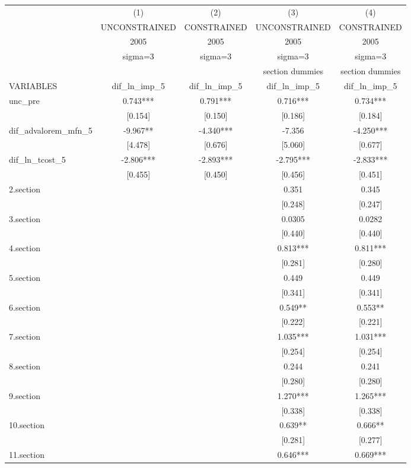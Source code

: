 \begin{tabular}{lcccc}
\toprule
 & (1) & (2) & (3) & (4) \\
 & UNCONSTRAINED & CONSTRAINED & UNCONSTRAINED & CONSTRAINED \\
 & 2005 & 2005 & 2005 & 2005 \\
 & sigma=3 & sigma=3 & sigma=3 & sigma=3 \\
 &  &  & section dummies & section dummies \\
VARIABLES & dif\_ln\_imp\_5 & dif\_ln\_imp\_5 & dif\_ln\_imp\_5 & dif\_ln\_imp\_5 \\
\midrule
unc\_pre & 0.743*** & 0.791*** & 0.716*** & 0.734*** \\
 & [0.154] & [0.150] & [0.186] & [0.184] \\
dif\_advalorem\_mfn\_5 & -9.967** & -4.340*** & -7.356 & -4.250*** \\
 & [4.478] & [0.676] & [5.060] & [0.677] \\
dif\_ln\_tcost\_5 & -2.806*** & -2.893*** & -2.795*** & -2.833*** \\
 & [0.455] & [0.450] & [0.456] & [0.451] \\
2.section &  &  & 0.351 & 0.345 \\
 &  &  & [0.248] & [0.247] \\
3.section &  &  & 0.0305 & 0.0282 \\
 &  &  & [0.440] & [0.440] \\
4.section &  &  & 0.813*** & 0.811*** \\
 &  &  & [0.281] & [0.280] \\
5.section &  &  & 0.449 & 0.449 \\
 &  &  & [0.341] & [0.341] \\
6.section &  &  & 0.549** & 0.553** \\
 &  &  & [0.222] & [0.221] \\
7.section &  &  & 1.035*** & 1.031*** \\
 &  &  & [0.254] & [0.254] \\
8.section &  &  & 0.244 & 0.241 \\
 &  &  & [0.280] & [0.280] \\
9.section &  &  & 1.270*** & 1.265*** \\
 &  &  & [0.338] & [0.338] \\
10.section &  &  & 0.639** & 0.666** \\
 &  &  & [0.281] & [0.277] \\
11.section &  &  & 0.646*** & 0.669*** \\

\end{tabular}
